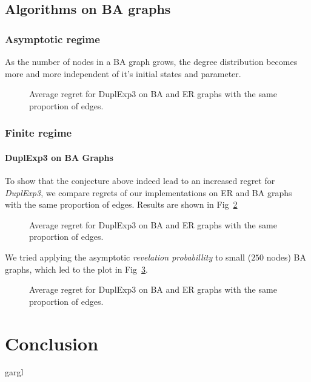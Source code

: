 \documentclass[10pt,a4paper]{scrartcl}
\begin{document}
\subsection{Algorithms on BA graphs}
\subsubsection{Asymptotic regime}
As the number of nodes in a BA graph grows, the degree distribution becomes more and more independent of it's initial states and parameter. 
\begin{figure}
 \label{dupl_er_ba}
 \caption{Average regret for DuplExp3 on BA and ER graphs with the same proportion of edges.}
\end{figure}
\subsubsection{Finite regime}
\paragraph{DuplExp3 on BA Graphs}
To show that the conjecture above indeed lead to an increased regret for \emph{DuplExp3}, we compare regrets of our implementations on ER and BA graphs with the same proportion of edges. Results are shown in Fig~\ref{dupl_er_ba}

\begin{figure}
 \label{dupl_er_ba}
 \caption{Average regret for DuplExp3 on BA and ER graphs with the same proportion of edges.}
\end{figure}

We tried applying the asymptotic \emph{revelation probabillity} to small ($250$ nodes) BA graphs, which led to the plot in Fig~\ref{dupl_ba_finite_ba}.

\begin{figure}
 \label{dupl_ba_finite_ba}
 \caption{Average regret for DuplExp3 on BA and ER graphs with the same proportion of edges.}
\end{figure}


\section{Conclusion}
gargl
\end{document}
